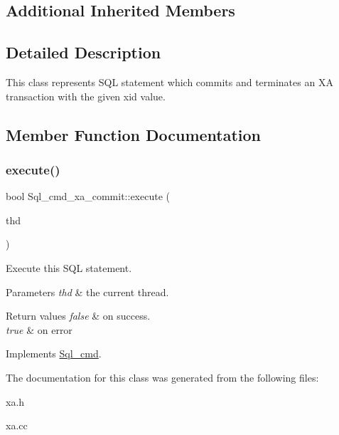 \subsection*{Additional Inherited Members}


\subsection{Detailed Description}
This class represents S\+QL statement which commits and terminates an XA transaction with the given xid value. 

\subsection{Member Function Documentation}
\mbox{\label{classSql__cmd__xa__commit_a5c883806812b74adc71d7eba693e863a}} 
\subsubsection{\texorpdfstring{execute()}{execute()}}
{\footnotesize\ttfamily bool Sql\+\_\+cmd\+\_\+xa\+\_\+commit\+::execute (\begin{DoxyParamCaption}\item[{T\+HD $\ast$}]{thd }\end{DoxyParamCaption})\hspace{0.3cm}{\ttfamily [virtual]}}

Execute this S\+QL statement. 
\begin{DoxyParams}{Parameters}
{\em thd} & the current thread. \\
\hline
\end{DoxyParams}

\begin{DoxyRetVals}{Return values}
{\em false} & on success. \\
\hline
{\em true} & on error \\
\hline
\end{DoxyRetVals}


Implements \mbox{\hyperlink{classSql__cmd_a213367b79b551296fbb7790f2a3732fb}{Sql\+\_\+cmd}}.



The documentation for this class was generated from the following files\+:\begin{DoxyCompactItemize}
\item 
xa.\+h\item 
xa.\+cc\end{DoxyCompactItemize}
